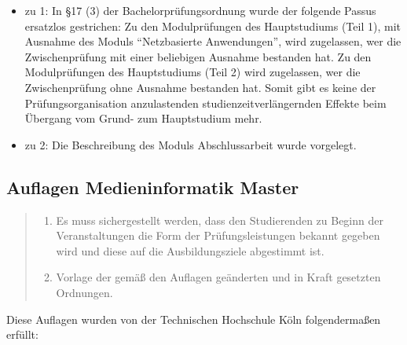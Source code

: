 \begin{itemize}
\tightlist
\item
  zu 1: In §17 (3) der Bachelorprüfungsordnung wurde der folgende Passus
  ersatzlos gestrichen: Zu den Modulprüfungen des Hauptstudiums (Teil
  1), mit Ausnahme des Moduls ``Netzbasierte Anwendungen'', wird
  zugelassen, wer die Zwischenprüfung mit einer beliebigen Ausnahme
  bestanden hat. Zu den Modulprüfungen des Hauptstudiums (Teil 2) wird
  zugelassen, wer die Zwischenprüfung ohne Ausnahme bestanden hat. Somit
  gibt es keine der Prüfungsorganisation anzulastenden
  studienzeitverlängernden Effekte beim Übergang vom Grund- zum
  Hauptstudium mehr.
\item
  zu 2: Die Beschreibung des Moduls Abschlussarbeit wurde vorgelegt.
\end{itemize}

\subsection{Auflagen Medieninformatik
Master}\label{auflagen-medieninformatik-master}

\begin{quote}
\begin{enumerate}
\def\labelenumi{\arabic{enumi}.}
\tightlist
\item
  Es muss sichergestellt werden, dass den Studierenden zu Beginn der
  Veranstaltungen die Form der Prüfungsleistungen bekannt gegeben wird
  und diese auf die Ausbildungsziele abgestimmt ist.
\item
  Vorlage der gemäß den Auflagen geänderten und in Kraft gesetzten
  Ordnungen.
\end{enumerate}
\end{quote}

Diese Auflagen wurden von der Technischen Hochschule Köln folgendermaßen
erfüllt:

